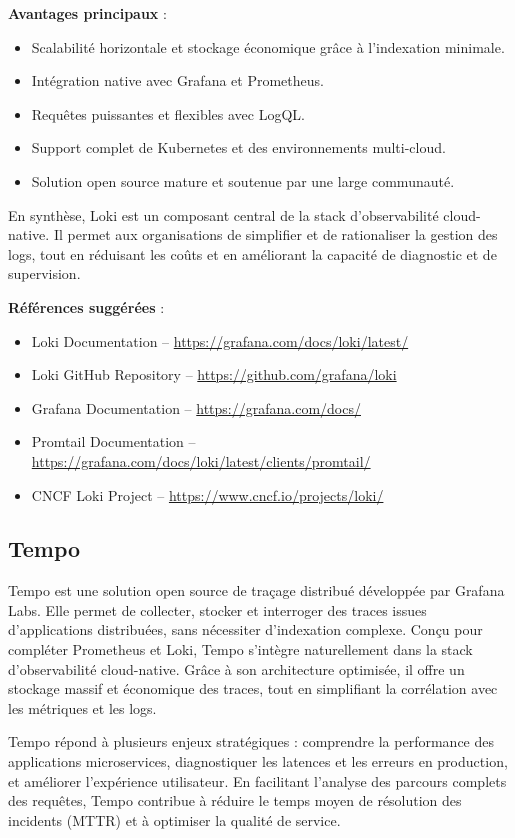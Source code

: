 \textbf{Avantages principaux} :
\begin{itemize}
	\item Scalabilité horizontale et stockage économique grâce à l’indexation minimale.
	\item Intégration native avec Grafana et Prometheus.
	\item Requêtes puissantes et flexibles avec LogQL.
	\item Support complet de Kubernetes et des environnements multi-cloud.
	\item Solution open source mature et soutenue par une large communauté.
\end{itemize}

En synthèse, Loki est un composant central de la stack d’observabilité cloud-native. Il permet aux organisations de simplifier et de rationaliser la gestion des logs, tout en réduisant les coûts et en améliorant la capacité de diagnostic et de supervision.

\textbf{Références suggérées} :
\begin{itemize}
	\item Loki Documentation – \url{https://grafana.com/docs/loki/latest/}
	\item Loki GitHub Repository – \url{https://github.com/grafana/loki}
	\item Grafana Documentation – \url{https://grafana.com/docs/}
	\item Promtail Documentation – \url{https://grafana.com/docs/loki/latest/clients/promtail/}
	\item CNCF Loki Project – \url{https://www.cncf.io/projects/loki/}
\end{itemize}


\subsection{Tempo}

Tempo est une solution open source de traçage distribué développée par Grafana Labs. Elle permet de collecter, stocker et interroger des traces issues d’applications distribuées, sans nécessiter d’indexation complexe. Conçu pour compléter Prometheus et Loki, Tempo s’intègre naturellement dans la stack d’observabilité cloud-native. Grâce à son architecture optimisée, il offre un stockage massif et économique des traces, tout en simplifiant la corrélation avec les métriques et les logs.

 Tempo répond à plusieurs enjeux stratégiques  : comprendre la performance des applications microservices, diagnostiquer les latences et les erreurs en production, et améliorer l’expérience utilisateur. En facilitant l’analyse des parcours complets des requêtes, Tempo contribue à réduire le temps moyen de résolution des incidents (MTTR) et à optimiser la qualité de service.

